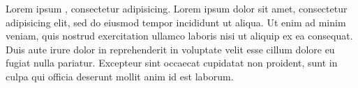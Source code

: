 \documentclass{article}
\begin{document}
Lorem ipsum , consectetur adipisicing. Lorem
ipsum dolor sit amet, consectetur adipisicing elit, sed do eiusmod
tempor incididunt ut  aliqua. Ut enim
ad minim veniam, quis nostrud exercitation ullamco laboris nisi ut
aliquip ex ea  consequat. Duis aute irure dolor in reprehenderit
in voluptate velit esse cillum dolore eu fugiat nulla pariatur.
Excepteur sint occaecat cupidatat non proident, sunt in culpa qui
officia deserunt mollit anim id est laborum.
\end{document}
